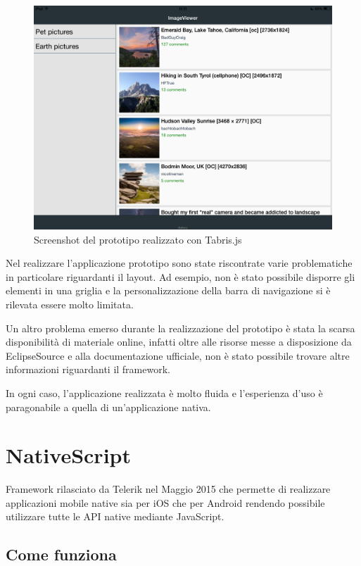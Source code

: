 \begin{figure}[htp]
\centering
\includegraphics[width=\textwidth]{../immagini/prototipo-tabris}
\caption{Screenshot del prototipo realizzato con Tabris.js}  
\end{figure}

Nel realizzare l'applicazione prototipo sono state riscontrate varie problematiche in particolare riguardanti il layout.
Ad esempio, non è stato possibile disporre gli elementi in una griglia e la personalizzazione della barra di navigazione si è rilevata essere molto limitata.

Un altro problema emerso durante la realizzazione del prototipo è stata la scarsa disponibilità di materiale online, infatti oltre alle risorse messe a disposizione da EclipseSource e alla documentazione ufficiale, non è stato possibile trovare altre informazioni riguardanti il framework.

In ogni caso, l'applicazione realizzata è molto fluida e l'esperienza d'uso è paragonabile a quella di un'applicazione nativa.

\FloatBarrier
\section{NativeScript}

Framework rilasciato da Telerik nel Maggio 2015 che permette di realizzare applicazioni mobile native sia per iOS che per Android rendendo possibile utilizzare tutte le API native mediante JavaScript.

\subsection{Come funziona}

